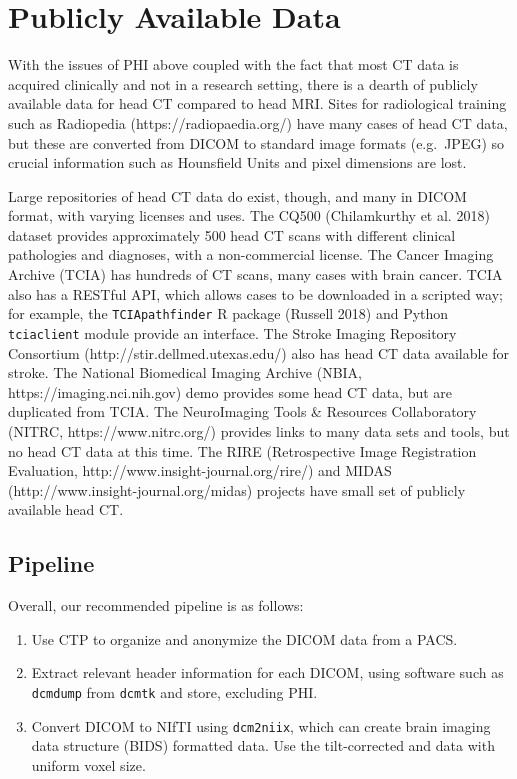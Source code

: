 \documentclass[]{elsarticle} %
\providecommand{\tightlist}{%
  \setlength{\itemsep}{0pt}\setlength{\parskip}{0pt}}
\begin{document}
\hypertarget{publicly-available-data}{%
\section{Publicly Available Data}\label{publicly-available-data}}

With the issues of PHI above coupled with the fact that most CT data is
acquired clinically and not in a research setting, there is a dearth of
publicly available data for head CT compared to head MRI. Sites for
radiological training such as Radiopedia (https://radiopaedia.org/) have
many cases of head CT data, but these are converted from DICOM to
standard image formats (e.g.~JPEG) so crucial information such as
Hounsfield Units and pixel dimensions are lost.

Large repositories of head CT data do exist, though, and many in DICOM
format, with varying licenses and uses. The CQ500 (Chilamkurthy et al.
2018) dataset provides approximately 500 head CT scans with different
clinical pathologies and diagnoses, with a non-commercial license. The
Cancer Imaging Archive (TCIA) has hundreds of CT scans, many cases with
brain cancer. TCIA also has a RESTful API, which allows cases to be
downloaded in a scripted way; for example, the \texttt{TCIApathfinder} R
package (Russell 2018) and Python \texttt{tciaclient} module provide an
interface. The Stroke Imaging Repository Consortium
(http://stir.dellmed.utexas.edu/) also has head CT data available for
stroke. The National Biomedical Imaging Archive (NBIA,
https://imaging.nci.nih.gov) demo provides some head CT data, but are
duplicated from TCIA. The NeuroImaging Tools \& Resources Collaboratory
(NITRC, https://www.nitrc.org/) provides links to many data sets and
tools, but no head CT data at this time. The RIRE (Retrospective Image
Registration Evaluation, http://www.insight-journal.org/rire/) and MIDAS
(http://www.insight-journal.org/midas) projects have small set of
publicly available head CT.

\hypertarget{pipeline}{%
\subsection{Pipeline}\label{pipeline}}

Overall, our recommended pipeline is as follows:

\begin{enumerate}
\def\labelenumi{\arabic{enumi}.}
\tightlist
\item
  Use CTP to organize and anonymize the DICOM data from a PACS.
\item
  Extract relevant header information for each DICOM, using software
  such as \texttt{dcmdump} from \texttt{dcmtk} and store, excluding PHI.
\item
  Convert DICOM to NIfTI using \texttt{dcm2niix}, which can create brain
  imaging data structure (BIDS) formatted data. Use the tilt-corrected
  and data with uniform voxel size.
\end{enumerate}
\end{document}
